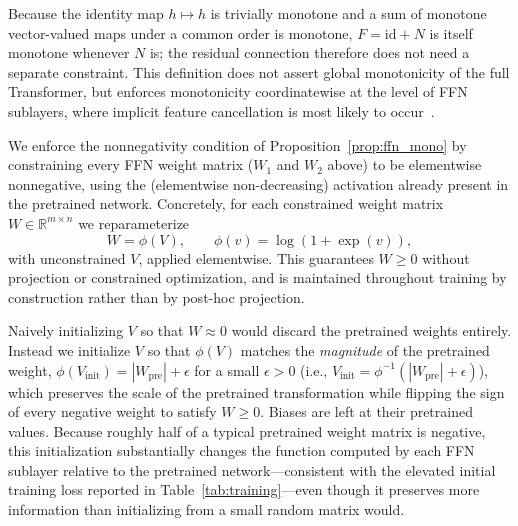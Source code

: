 \documentclass{article}
\theoremstyle{plain}
\theoremstyle{definition}
\newtheorem{definition}[theorem]{Definition}
\theoremstyle{remark}
\begin{document}
Because the identity map $h \mapsto h$ is trivially monotone and a sum of monotone
vector-valued maps under a common order is monotone, $F = \mathrm{id} + N$ is itself
monotone whenever $N$ is; the residual connection therefore does not need a separate
constraint. This definition does not assert global monotonicity of the full Transformer, but enforces monotonicity coordinatewise at the level of FFN sublayers, where implicit feature cancellation is most likely to occur~\cite{runje2023constrained,sartor2025advancing,nguyen2023mononet}.




We enforce the nonnegativity condition of Proposition~\ref{prop:ffn_mono} by
constraining every FFN weight matrix ($W_1$ and $W_2$ above) to be elementwise
nonnegative, using the (elementwise non-decreasing) activation already present
in the pretrained network. Concretely, for each constrained weight matrix
$W \in \mathbb{R}^{m\times n}$ we reparameterize
\[
W = \phi(V), \qquad \phi(v) = \log(1+\exp(v)),
\]
with unconstrained $V$, applied elementwise. This guarantees $W \ge 0$ without
projection or constrained optimization, and is maintained throughout training
by construction rather than by post-hoc projection.

Naively initializing $V$ so that $W \approx 0$ would discard the pretrained
weights entirely. Instead we initialize $V$ so that $\phi(V)$ matches the
\emph{magnitude} of the pretrained weight, $\phi(V_{\mathrm{init}}) = |W_{\mathrm{pre}}| + \epsilon$
for a small $\epsilon > 0$ (i.e., $V_{\mathrm{init}} = \phi^{-1}(|W_{\mathrm{pre}}|+\epsilon)$),
which preserves the scale of the pretrained transformation while flipping the
sign of every negative weight to satisfy $W \ge 0$. Biases are left at their
pretrained values. Because roughly half of a typical pretrained weight matrix
is negative, this initialization substantially changes the function computed
by each FFN sublayer relative to the pretrained network—consistent with the
elevated initial training loss reported in Table~\ref{tab:training}—even
though it preserves more information than initializing from a small random
matrix would.
\end{document}
